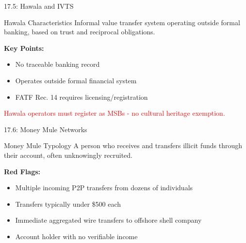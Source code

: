 \documentclass{beamer}
\begin{document}
	\begin{frame}{17.5: Hawala and IVTS}
		\begin{block}{Hawala Characteristics}
			Informal value transfer system operating outside formal banking, based on trust and reciprocal obligations.
		\end{block}
		\textbf{Key Points:}
		\begin{itemize}
			\item No traceable banking record
			\item Operates outside formal financial system
			\item FATF Rec. 14 requires licensing/registration
		\end{itemize}
		\textcolor{red}{Hawala operators must register as MSBs - no cultural heritage exemption.}
	\end{frame}
	
	\begin{frame}{17.6: Money Mule Networks}
		\begin{block}{Money Mule Typology}
			A person who receives and transfers illicit funds through their account, often unknowingly recruited.
		\end{block}
		\textbf{Red Flags:}
		\begin{itemize}
			\item Multiple incoming P2P transfers from dozens of individuals
			\item Transfers typically under \$500 each
			\item Immediate aggregated wire transfers to offshore shell company
			\item Account holder with no verifiable income
		\end{itemize}
	\end{frame}
	
	
\end{document}
